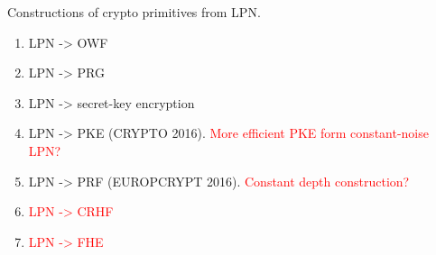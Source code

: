 \noindent Constructions of crypto primitives from LPN. 
\begin{enumerate}
	\item LPN -> OWF
	\item LPN -> PRG
	\item LPN -> secret-key encryption \cite{??}
	\item LPN -> PKE \cite{??} (CRYPTO 2016). \textcolor{red}{More efficient PKE form constant-noise LPN?}
	\item LPN -> PRF \cite{??} (EUROPCRYPT 2016). \textcolor{red}{Constant depth construction?}
	\item \textcolor{red}{LPN -> CRHF}
	\item \textcolor{red}{LPN -> FHE}
\end{enumerate}